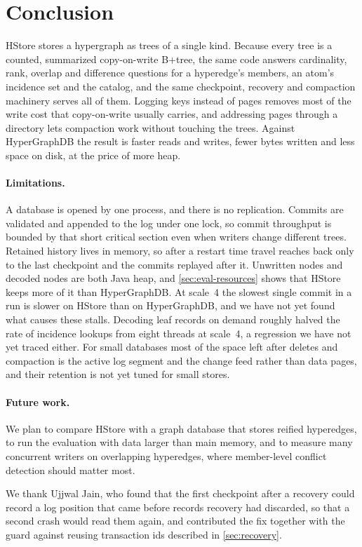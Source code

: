 \section{Conclusion}
\label{sec:conclusion}

HStore stores a hypergraph as trees of a single kind. Because every tree is a counted, summarized copy-on-write B+tree, the same code answers cardinality, rank, overlap and difference questions for a hyperedge's members, an atom's incidence set and the catalog, and the same checkpoint, recovery and compaction machinery serves all of them. Logging keys instead of pages removes most of the write cost that copy-on-write usually carries, and addressing pages through a directory lets compaction work without touching the trees. Against HyperGraphDB the result is faster reads and writes, fewer bytes written and less space on disk, at the price of more heap.

\paragraph{Limitations.} A database is opened by one process, and there is no replication. Commits are validated and appended to the log under one lock, so commit throughput is bounded by that short critical section even when writers change different trees. Retained history lives in memory, so after a restart time travel reaches back only to the last checkpoint and the commits replayed after it. Unwritten nodes and decoded nodes are both Java heap, and \cref{sec:eval-resources} shows that HStore keeps more of it than HyperGraphDB. At scale~4 the slowest single commit in a run is slower on HStore than on HyperGraphDB, and we have not yet found what causes these stalls. Decoding leaf records on demand roughly halved the rate of incidence lookups from eight threads at scale~4, a regression we have not yet traced either. For small databases most of the space left after deletes and compaction is the active log segment and the change feed rather than data pages, and their retention is not yet tuned for small stores.

\paragraph{Future work.} We plan to compare HStore with a graph database that stores reified hyperedges, to run the evaluation with data larger than main memory, and to measure many concurrent writers on overlapping hyperedges, where member-level conflict detection should matter most.

\begin{acks}
We thank Ujjwal Jain, who found that the first checkpoint after a recovery could record a log position that came before records recovery had discarded, so that a second crash would read them again, and contributed the fix together with the guard against reusing transaction ids described in \cref{sec:recovery}.
\end{acks}
